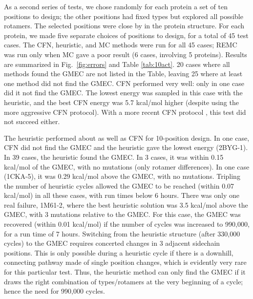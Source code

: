 \documentclass[a4paper,12pt]{article}
\begin{document}
As a second series of tests, we chose randomly for each protein a set of ten positions to design; the other positions
had fixed types but explored all possible rotamers. The selected positions were close by in the protein structure. For
each protein, we made five separate choices of positions to design, for a total of 45 test cases. The CFN, heuristic,
and MC methods were run for all 45 cases; REMC was run only when MC gave a poor result (6 cases, involving 5 proteins).
Results are summarized in Fig.\ \ref{fig:errors} and Table \ref{tab:10act}. 20 cases where all methods found the GMEC
are not listed in the Table, leaving 25 where at least one method did not find the GMEC. CFN performed very well: only
in one case did it not find the GMEC. The lowest energy was sampled in this case with the heuristic, and the best CFN
energy was 5.7 kcal/mol higher (despite using the more aggressive CFN protocol). With a more recent CFN protocol
\cite{Simoncini15}, this test did not succeed either.

The heuristic performed about as well as CFN for 10-position design. In one case, CFN did not find the GMEC and
the heuristic gave the lowest energy (2BYG-1). In 39 cases, the heuristic found the GMEC. In 3 cases, it was within
0.15 kcal/mol of the GMEC, with no mutations (only rotamer differences). In one case (1CKA-5), it was 0.29 kcal/mol
above the GMEC, with no mutations. Tripling the number of heuristic cycles allowed the GMEC to be reached (within
0.07 kcal/mol) in all these cases, with run times below 6 hours. There was only one real failure, 1M61-2, where
the best heuristic solution was 3.5 kcal/mol above the GMEC, with 3 mutations relative to the GMEC. For this case,
the GMEC was recovered (within 0.01 kcal/mol) if the number of cycles was increased to 990,000, for a run time of 7
hours. Switching from the heuristic structure (after 330,000 cycles) to the GMEC requires concerted changes in 3
adjacent sidechain positions. This is only possible during a heuristic cycle if there is a downhill, connecting pathway
made of single position changes, which is evidently very rare for this particular test. Thus, the heuristic method
can only find the GMEC if it draws the right combination of types/rotamers at the very beginning of a cycle; hence
the need for 990,000 cycles.
\end{document}
